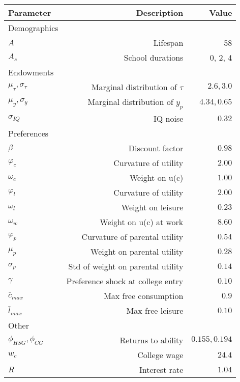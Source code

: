 \begin{tabular}{lrr}
\hline
Parameter & Description  & Value  \\ 
\hline
Demographics &   &   \\ 
$A$ & Lifespan  & 58  \\ 
$A_{s}$ & School durations  & 0, 2, 4  \\ 
Endowments &   &   \\ 
$\mu_{\tau}, \sigma_{\tau}$ & Marginal distribution of $\tau$  & $2.6, 3.0$  \\ 
$\mu_{y}, \sigma_{y}$ & Marginal distribution of $y_{p}$  & $4.34, 0.65$  \\ 
$\sigma_{IQ}$ & IQ noise  & $0.32$  \\ 
Preferences &   &   \\ 
$\beta$ & Discount factor  & $0.98$  \\ 
$\varphi_{c}$ & Curvature of utility  & $2.00$  \\ 
$\omega_{c}$ & Weight on u(c)  & $1.00$  \\ 
$\varphi_{l}$ & Curvature of utility  & $2.00$  \\ 
$\omega_{l}$ & Weight on leisure  & $0.23$  \\ 
$\omega_{w}$ & Weight on u(c) at work  & $8.60$  \\ 
$\varphi_{p}$ & Curvature of parental utility  & $0.54$  \\ 
$\mu_{p}$ & Weight on parental utility  & $0.28$  \\ 
$\sigma_{p}$ & Std of weight on parental utility  & $0.14$  \\ 
$\gamma$ & Preference shock at college entry  & $0.10$  \\ 
$\bar{c}_{max}$ & Max free consumption  & $0.9$  \\ 
$\bar{l}_{max}$ & Max free leisure  & $0.10$  \\ 
Other &   &   \\ 
$\phi_{HSG}, \phi_{CG}$ & Returns to ability  & $0.155, 0.194$  \\ 
$w_{c}$ & College wage  & $24.4$  \\ 
$R$ & Interest rate  & $1.04$  \\ 
\hline
\end{tabular}%
